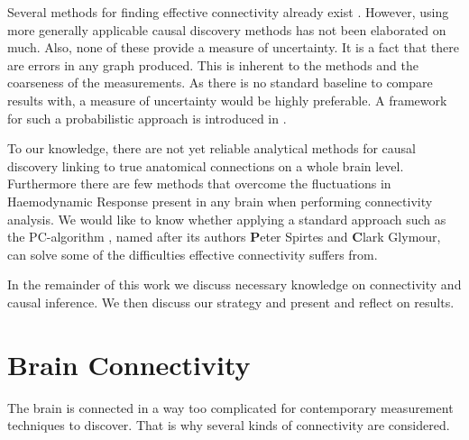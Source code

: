 \documentclass[a4paper, 10pt, english, onecolumn]{article}
\begin{document}
Several methods for finding effective connectivity already exist \cite{mclntosh1994, harrison2003, friston2003, roebroeck2005}.
However, using more generally applicable causal discovery methods has not been elaborated on much.
Also, none of these provide a measure of uncertainty.
It is a fact that there are errors in any graph produced.
This is inherent to the methods and the coarseness of the measurements.
As there is no standard baseline to compare results with, a measure of uncertainty would be highly preferable.
A framework for such a probabilistic approach is introduced in \cite{claassen2012}.

To our knowledge, there are not yet reliable analytical methods for causal discovery linking to true anatomical connections on a whole brain level.
Furthermore there are few methods that overcome the fluctuations in Haemodynamic Response present in any brain when performing connectivity analysis. %
We would like to know whether applying a standard approach such as the PC-algorithm \cite{spirtes2000}, named after its authors \textbf{P}eter Spirtes and \textbf{C}lark Glymour, can solve some of the difficulties effective connectivity suffers from.

In the remainder of this work we discuss necessary knowledge on connectivity and causal inference.
We then discuss our strategy and present and reflect on results.

\section{Brain Connectivity}
The brain is connected in a way too complicated for contemporary measurement techniques to discover.
That is why several kinds of connectivity are considered.
\end{document}
